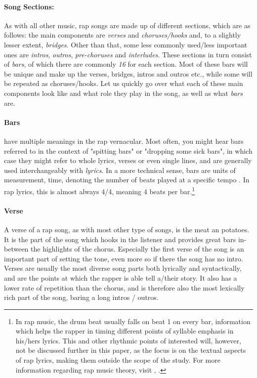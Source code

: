 \paragraph{Song Sections:\\[6pt]}
\label{para:song-components}

As with all other music, rap songs are made up of different sections, which are as follows: the main components are \textit{verses} and \textit{choruses/hooks} and, to a slightly lesser extent, \textit{bridges}. Other than that, some less commonly used/less important ones are \textit{intros}, \textit{outros}, \textit{pre-choruses} and \textit{interludes}. These sections in turn consist of \textit{bars}, of which there are commonly \textit{16} for each section. Most of these bars will be unique and make up the verses, bridges, intros and outros etc., while some will be repeated as choruses/hooks. Let us quickly go over what each of these main components look like and what role they play in the song, as well as what \textit{bars} are.

\paragraph{Bars}
have multiple meanings in the rap vernacular. Most often, you might hear bars referred to in the context of "spitting bars" or "dropping some sick bars", in which case they might refer to whole lyrics, verses or even single lines, and are generally used interchangeably with \textit{lyrics}. In a more technical sense, bars are units of measurement, time, denoting the number of beats played at a specific tempo \cite{RapBars2022}. In rap lyrics, this is almost always 4/4, meaning 4 beats per bar.\footnote{In rap music, the drum beat usually falls on beat 1 on every bar, information which helps the rapper in timing different points of syllable emphasis in his/hers lyrics. This and other rhythmic points of interested will, however, not be discussed further in this paper, as the focus is on the textual aspects of rap lyrics, making them outside the scope of the study. For more information regarding rap music theory, visit \cite{RapBars2022}, \cite{RapAnalysis2014}.}

\paragraph{Verse}
A verse of a rap song, as with most other type of songs, is the meat an potatoes. It is the part of the song which hooks in the listener and provides great bars in-between the highlights of the chorus. Especially the first verse of the song is an important part of setting the tone, even more so if there the song has no intro. Verses are usually the most diverse song parts both lyrically and syntactically, and are the points at which the rapper is able tell a/their story. It also has a lower rate of repetition than the chorus, and is therefore also the most lexically rich part of the song, baring a long intros / outros.

